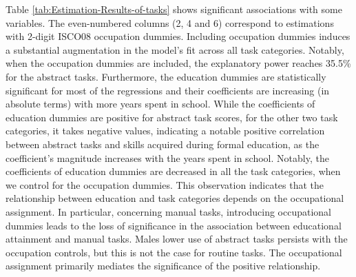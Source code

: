 \begin{onehalfspace}
Table \ref{tab:Estimation-Results-of-tasks} shows significant associations
with some variables. The even-numbered columns (2, 4 and 6) correspond
to estimations with 2-digit ISCO08 occupation dummies. Including occupation
dummies induces a substantial augmentation in the model's fit across
all task categories. Notably, when the occupation dummies are included,
the explanatory power reaches 35.5\% for the abstract tasks. Furthermore,
the education dummies are statistically significant for most of the
regressions and their coefficients are increasing (in absolute terms)
with more years spent in school. While the coefficients of education
dummies are positive for abstract task scores, for the other two task
categories, it takes negative values, indicating a notable positive
correlation between abstract tasks and skills acquired during formal
education, as the coefficient's magnitude increases with the years
spent in school. Notably, the coefficients of education dummies are
decreased in all the task categories, when we control for the occupation
dummies. This observation indicates that the relationship between
education and task categories depends on the occupational assignment.
In particular, concerning manual tasks, introducing occupational dummies
leads to the loss of significance in the association between educational
attainment and manual tasks. Males lower use of abstract tasks persists
with the occupation controls, but this is not the case for routine
tasks. The occupational assignment primarily mediates the significance
of the positive relationship.
\end{onehalfspace}
\begin{center}

\par\end{center}

\vspace{-1cm}

